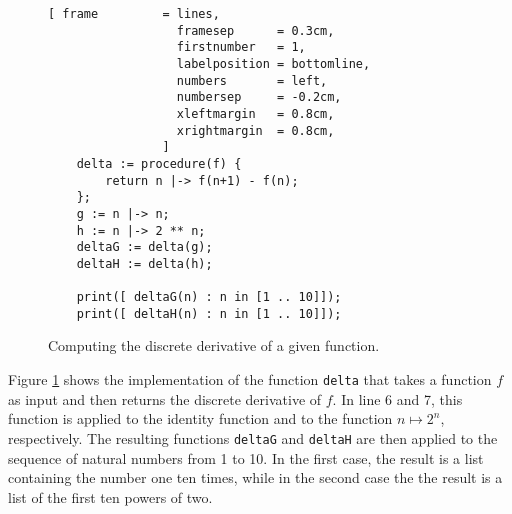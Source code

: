 \begin{figure}[!ht]
\centering
\begin{Verbatim}[ frame         = lines, 
                  framesep      = 0.3cm, 
                  firstnumber   = 1,
                  labelposition = bottomline,
                  numbers       = left,
                  numbersep     = -0.2cm,
                  xleftmargin   = 0.8cm,
                  xrightmargin  = 0.8cm,
                ]
    delta := procedure(f) {
        return n |-> f(n+1) - f(n);
    };    
    g := n |-> n;
    h := n |-> 2 ** n;
    deltaG := delta(g);
    deltaH := delta(h);
    
    print([ deltaG(n) : n in [1 .. 10]]);
    print([ deltaH(n) : n in [1 .. 10]]);
\end{Verbatim}
\vspace*{-0.3cm}
\caption{Computing the discrete derivative of a given function.}
\label{fig:finite-difference.stlx}
\end{figure}

\noindent
Figure \ref{fig:finite-difference.stlx} shows the implementation of the function \texttt{delta}
that takes a function $f$ as input and then returns the discrete derivative of $f$.  In line 6
and 7, this function is applied to the identity function and to the function $n \mapsto 2^n$,
respectively.  The resulting functions \texttt{deltaG} and \texttt{deltaH} are then applied to
the sequence of natural numbers from 1 to 10.  In the first case, the result is a list
containing the number one ten times, while in the second case the the result is a list of the
first ten powers of two.


